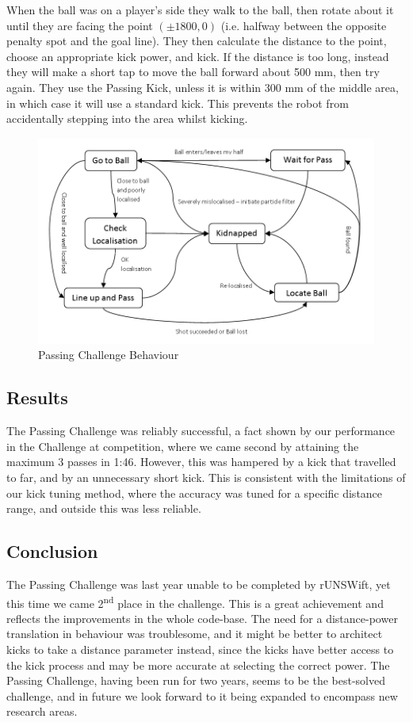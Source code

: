 \documentclass[pdftex,11pt,a4paper]{report}
\begin{document}
When the ball was on a player's side they walk to the ball, then rotate
about it until they are facing the point $(\pm1800, 0)$ (i.e. halfway
between the opposite penalty spot and the goal line). They then calculate
the distance to the point, choose an appropriate kick power, and kick. If
the distance is too long, instead they will make a short tap to move the
ball forward about 500 mm, then try again. They use the Passing Kick,
unless it is within 300 mm of the middle area, in which case it will use a
standard kick. This prevents the robot from accidentally stepping into the
area whilst kicking.
\begin{figure}[ht]
   \begin{center}
      \includegraphics[width=\textwidth]{figures/passing_behaviour}
   \end{center}
   \caption{Passing Challenge Behaviour}
   \label{fig:Passing_behaviour}
\end{figure}
\subsection{Results}
The Passing Challenge was reliably successful, a fact shown by our
performance in the Challenge at competition, where we came second by
attaining the maximum 3 passes in 1:46. However, this was hampered by a
kick that travelled to far, and by an unnecessary short kick. This is
consistent with the limitations of our kick tuning method, where the
accuracy was tuned for a specific distance range, and outside this was less
reliable.

\subsection{Conclusion}	
The Passing Challenge was last year unable to be completed by rUNSWift, yet
this time we came 2\textsuperscript{nd} place in the challenge. This is a great
achievement and reflects the improvements in the whole code-base. The need
for a distance-power translation in behaviour was troublesome, and it might
be better to architect kicks to take a distance parameter instead, since
the kicks have better access to the kick process and may be more accurate
at selecting the correct power. The Passing Challenge, having been run for
two years, seems to be the best-solved challenge, and in future we look
forward to it being expanded to encompass new research areas.
\end{document}
